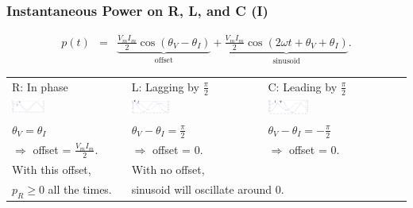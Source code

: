 \documentclass{beamer}
\begin{document}
\begin{frame}[fragile]
\frametitle{Instantaneous Power on R, L, and C (I)}

\vspace{-1cm}

\begin{eqnarray}
p(t) &=& \underbrace{\frac{V_m I_m}{2} \cos(\theta_V - \theta_I)}_{\mbox{offset}} + \underbrace{\frac{V_m I_m}{2} \cos(2 \omega t + \theta_V + \theta_I)}_{\mbox{sinusoid}}
\nonumber .
\end{eqnarray}
%
\begin{tabular}{|l|l|l|}
\hline
R: In phase & L: Lagging by $\frac{\pi}{2}$ & C: Leading by $\frac{\pi}{2}$ \\
\includegraphics[width=0.3\textwidth]{src/FigRLC_inphase.png}
&
\includegraphics[width=0.3\textwidth]{src/FigRLC_lagging.png}
&
\includegraphics[width=0.3\textwidth]{src/FigRLC_leading.png}
\\
$\theta_V = \theta_I$ 
& 
$\theta_V - \theta_I = \frac{\pi}{2}$ 
& 
$\theta_V - \theta_I = -\frac{\pi}{2}$
\\
$\Rightarrow$ offset = $\frac{V_m I_m}{2}$.
&
$\Rightarrow$ offset = $0$.
&
$\Rightarrow$ offset = $0$.
\\
\hline
With this offset, 
&
\multicolumn{2}{l|}{With no offset, }
\\
$p_R \geq 0$ all the times.
&
\multicolumn{2}{l|}{sinusoid will oscillate around $0$.}
\\ \hline
\end{tabular}

\end{frame}

\end{document}

